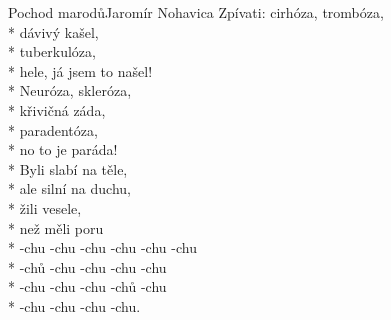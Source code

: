 \documentclass[10.5pt]{book}
\begin{document}
\begin{poem}{Pochod marodů}{Jaromír Nohavica}
Zpívati: cirhóza, trombóza,\\*
dávivý kašel,\\*
tuberkulóza,\\*
hele, já jsem to našel!\\*
Neuróza, skleróza,\\*
křivičná záda,\\*
paradentóza,\\*
no to je paráda!\\*
Byli slabí na těle,\\*
ale silní na duchu,\\*
žili vesele,\\*
než měli poru\\*
-chu -chu -chu -chu -chu -chu\\*
-chů -chu -chu -chu -chu\\*
-chu -chu -chu -chů -chu\\*
-chu -chu -chu -chu.

\end{poem}
\end{document}
